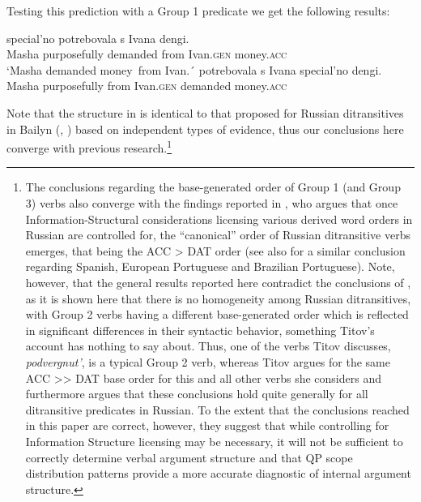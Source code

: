 \documentclass[output=paper,colorlinks,citecolor=brown,nonflat]{./langscibook}
\begin{document}
Testing this prediction with a Group 1 predicate we get the following results:

\ea%
    \label{ex:antonyuk:48}
    \ea \label{ex:antonyuk:48a}
       {special’no}    {potrebovala} {s}       {Ivana}      {dengi}.\\
    Masha purposefully demanded     from Ivan.\textsc{gen} money.\textsc{acc}\\
    \glt `Masha demanded money~from Ivan.´
    \ex \label{ex:antonyuk:48b}
       {potrebovala}  {s}       {Ivana}       {special’no} {dengi}.\\
    Masha purposefully from Ivan.\textsc{gen} demanded  money.\textsc{acc}\\
    \z
\z

Note that the structure in  is identical to that proposed for Russian ditransitives in Bailyn (\citeyear{Bailyn1995}, \citeyear{Bailyn2012}) based on independent types of evidence, thus our conclusions here converge with previous research.\footnote{The conclusions regarding the base-generated order of Group 1 (and Group 3) verbs also converge with the findings reported in \citet{Titov2017}, who argues that once Information-Structural considerations licensing various derived word orders in Russian are controlled for, the “canonical” order of Russian ditransitive verbs emerges, that being the ACC > DAT order (see also  for a similar conclusion regarding Spanish, European Portuguese and Brazilian Portuguese). Note, however, that the general results reported here contradict the conclusions of \citet{Titov2017}, as it is shown here that there is no homogeneity among Russian ditransitives, with Group 2 verbs having a different base-generated order which is reflected in significant differences in their syntactic behavior, something Titov’s account has nothing to say about. Thus, one of the verbs Titov discusses, \textit{podvergnut’}, is a typical Group 2 verb, whereas Titov argues for the same ACC >> DAT base order for this and all other verbs she considers and furthermore argues that these conclusions hold quite generally for all ditransitive predicates in Russian. To the extent that the conclusions reached in this paper are correct, however, they suggest that while controlling for Information Structure licensing may be necessary, it will not be sufficient to correctly determine verbal argument structure and that QP scope distribution patterns provide a more accurate diagnostic of internal argument structure.}
\end{document}
